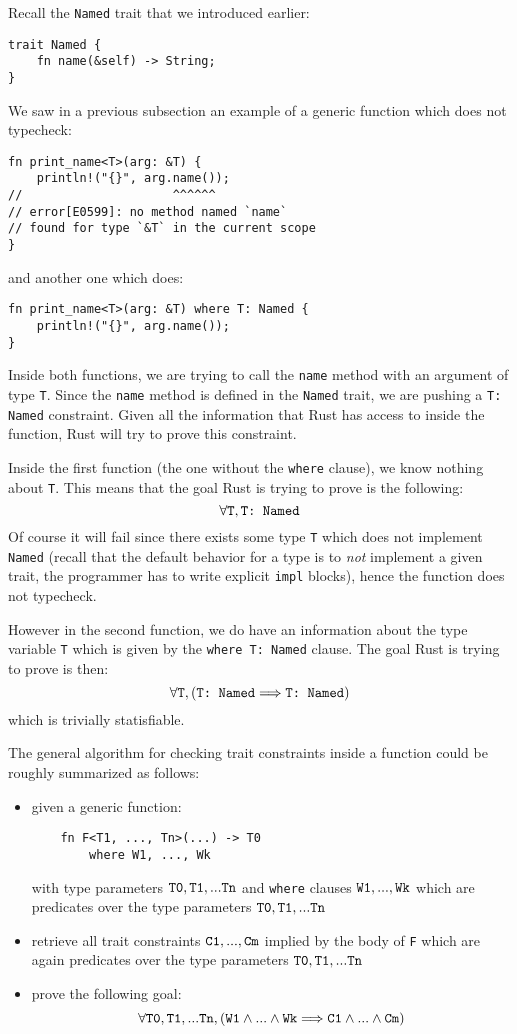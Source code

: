 \documentclass[twocolumn]{article}
\newcommand{\rust}[1]{\texttt{#1}}
\newcommand{\mrust}[1]{\text{\rust{#1}}}
\begin{document}
Recall the \rust{Named} trait that we introduced earlier:
\begin{verbatim}
trait Named {
    fn name(&self) -> String;
}
\end{verbatim}
We saw in a previous subsection an example of a generic function which does not typecheck:
\begin{verbatim}
fn print_name<T>(arg: &T) {
    println!("{}", arg.name());
//                     ^^^^^^
// error[E0599]: no method named `name`
// found for type `&T` in the current scope
}
\end{verbatim}
and another one which does:
\begin{verbatim}
fn print_name<T>(arg: &T) where T: Named {
    println!("{}", arg.name());
}
\end{verbatim}
Inside both functions, we are trying to call the \rust{name} method with an argument of type \rust{T}. Since the \rust{name} method is defined in the \rust{Named} trait, we are pushing a \rust{T: Named} constraint. Given all the information that Rust has access to inside the function, Rust will try to prove this constraint.

Inside the first function (the one without the \rust{where} clause), we know nothing about \rust{T}. This means that the goal Rust is trying to prove is the following:
\[
\forall \mrust{T}, \mrust{T: Named}
\]
Of course it will fail since there exists some type \rust{T} which does not implement \rust{Named} (recall that the default behavior for a type is to \textit{not} implement a given trait, the programmer has to write explicit \rust{impl} blocks), hence the function does not typecheck.

However in the second function, we do have an information about the type variable \rust{T} which is given by the \rust{where T: Named} clause. The goal Rust is trying to prove is then:
\[
\forall \mrust{T}, \left( \mrust{T: Named} \Longrightarrow \mrust{T: Named} \right)
\]
which is trivially statisfiable.

The general algorithm for checking trait constraints inside a function could be roughly summarized as follows:
\begin{itemize}
    \item given a generic function:
    \begin{verbatim}
    fn F<T1, ..., Tn>(...) -> T0
        where W1, ..., Wk
    \end{verbatim}
    with type parameters $\mrust{T0}, \mrust{T1}, ... \mrust{Tn}$ and \rust{where} clauses $\mrust{W1}, ..., \mrust{Wk}$ which are predicates over the type parameters $\mrust{T0}, \mrust{T1}, ... \mrust{Tn}$
    
    \item retrieve all trait constraints $\mrust{C1}, ..., \mrust{Cm}$ implied by the body of \rust{F} which are again predicates over the type parameters $\mrust{T0}, \mrust{T1}, ... \mrust{Tn}$
    
    \item prove the following goal:
    \[
        \forall \mrust{T0}, \mrust{T1}, ... \mrust{Tn}, (\mrust{W1} \land ... \land  \mrust{Wk} \Longrightarrow \mrust{C1} \land ... \land \mrust{Cm})
    \]
\end{itemize}
\end{document}
